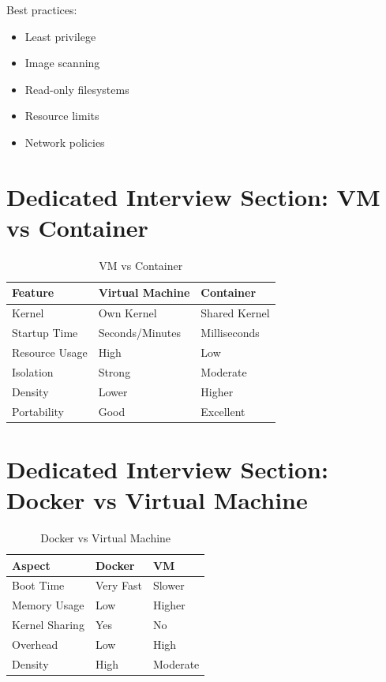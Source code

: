 Best practices:

\begin{itemize}
\item Least privilege
\item Image scanning
\item Read-only filesystems
\item Resource limits
\item Network policies
\end{itemize}

\section{Dedicated Interview Section: VM vs Container}

\begin{table}[H]
\centering
\begin{tabular}{lll}
\toprule
Feature & Virtual Machine & Container \\
\midrule
Kernel & Own Kernel & Shared Kernel \\
Startup Time & Seconds/Minutes & Milliseconds \\
Resource Usage & High & Low \\
Isolation & Strong & Moderate \\
Density & Lower & Higher \\
Portability & Good & Excellent \\
\bottomrule
\end{tabular}
\caption{VM vs Container}
\end{table}

\section{Dedicated Interview Section: Docker vs Virtual Machine}

\begin{table}[H]
\centering
\begin{tabular}{lll}
\toprule
Aspect & Docker & VM \\
\midrule
Boot Time & Very Fast & Slower \\
Memory Usage & Low & Higher \\
Kernel Sharing & Yes & No \\
Overhead & Low & High \\
Density & High & Moderate \\
\bottomrule
\end{tabular}
\caption{Docker vs Virtual Machine}
\end{table}


